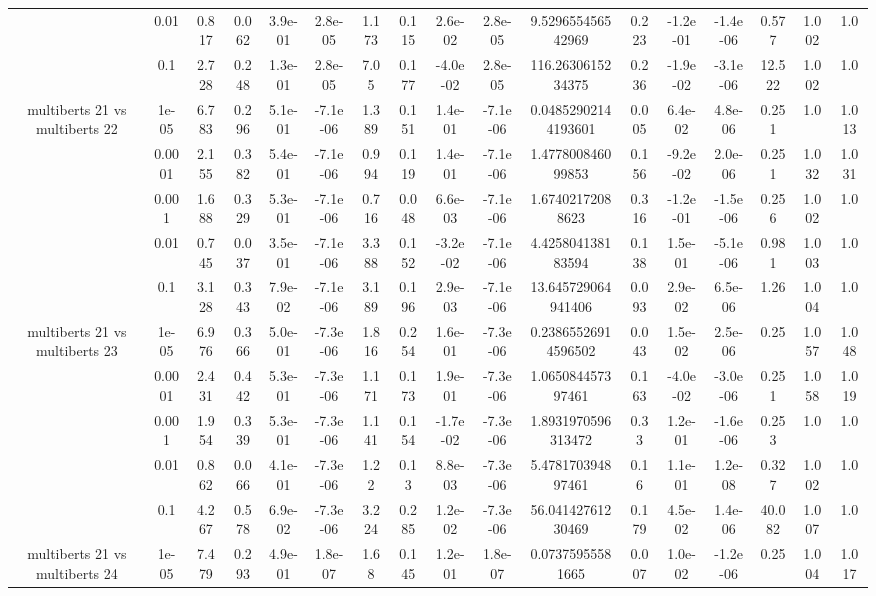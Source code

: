 \begin{tabular}{|c|c|c|c|c|c|c|c|c|c|c|c|c|c|c|c|c|}
 & 0.01 & 0.817 & 0.062 & 3.9e-01 & 2.8e-05 & 1.173 & 0.115 & 2.6e-02 & 2.8e-05 & 9.529655456542969 & 0.223 & -1.2e-01 & -1.4e-06 & 0.577 & 1.002 & 1.0 \\
 & 0.1 & 2.728 & 0.248 & 1.3e-01 & 2.8e-05 & 7.05 & 0.177 & -4.0e-02 & 2.8e-05 & 116.2630615234375 & 0.236 & -1.9e-02 & -3.1e-06 & 12.522 & 1.002 & 1.0 \\
\hline
\multirow{5}{*}{multiberts 21 vs multiberts 22} & 1e-05 & 6.783 & 0.296 & 5.1e-01 & -7.1e-06 & 1.389 & 0.151 & 1.4e-01 & -7.1e-06 & 0.04852902144193601 & 0.005 & 6.4e-02 & 4.8e-06 & 0.251 & 1.0 & 1.013 \\
 & 0.0001 & 2.155 & 0.382 & 5.4e-01 & -7.1e-06 & 0.994 & 0.119 & 1.4e-01 & -7.1e-06 & 1.477800846099853 & 0.156 & -9.2e-02 & 2.0e-06 & 0.251 & 1.032 & 1.031 \\
 & 0.001 & 1.688 & 0.329 & 5.3e-01 & -7.1e-06 & 0.716 & 0.048 & 6.6e-03 & -7.1e-06 & 1.67402172088623 & 0.316 & -1.2e-01 & -1.5e-06 & 0.256 & 1.002 & 1.0 \\
 & 0.01 & 0.745 & 0.037 & 3.5e-01 & -7.1e-06 & 3.388 & 0.152 & -3.2e-02 & -7.1e-06 & 4.425804138183594 & 0.138 & 1.5e-01 & -5.1e-06 & 0.981 & 1.003 & 1.0 \\
 & 0.1 & 3.128 & 0.343 & 7.9e-02 & -7.1e-06 & 3.189 & 0.196 & 2.9e-03 & -7.1e-06 & 13.645729064941406 & 0.093 & 2.9e-02 & 6.5e-06 & 1.26 & 1.004 & 1.0 \\
\hline
\multirow{5}{*}{multiberts 21 vs multiberts 23} & 1e-05 & 6.976 & 0.366 & 5.0e-01 & -7.3e-06 & 1.816 & 0.254 & 1.6e-01 & -7.3e-06 & 0.23865526914596502 & 0.043 & 1.5e-02 & 2.5e-06 & 0.25 & 1.057 & 1.048 \\
 & 0.0001 & 2.431 & 0.442 & 5.3e-01 & -7.3e-06 & 1.171 & 0.173 & 1.9e-01 & -7.3e-06 & 1.065084457397461 & 0.163 & -4.0e-02 & -3.0e-06 & 0.251 & 1.058 & 1.019 \\
 & 0.001 & 1.954 & 0.339 & 5.3e-01 & -7.3e-06 & 1.141 & 0.154 & -1.7e-02 & -7.3e-06 & 1.8931970596313472 & 0.33 & 1.2e-01 & -1.6e-06 & 0.253 & 1.0 & 1.0 \\
 & 0.01 & 0.862 & 0.066 & 4.1e-01 & -7.3e-06 & 1.22 & 0.13 & 8.8e-03 & -7.3e-06 & 5.478170394897461 & 0.16 & 1.1e-01 & 1.2e-08 & 0.327 & 1.002 & 1.0 \\
 & 0.1 & 4.267 & 0.578 & 6.9e-02 & -7.3e-06 & 3.224 & 0.285 & 1.2e-02 & -7.3e-06 & 56.04142761230469 & 0.179 & 4.5e-02 & 1.4e-06 & 40.082 & 1.007 & 1.0 \\
\hline
\multirow{5}{*}{multiberts 21 vs multiberts 24} & 1e-05 & 7.479 & 0.293 & 4.9e-01 & 1.8e-07 & 1.68 & 0.145 & 1.2e-01 & 1.8e-07 & 0.07375955581665 & 0.007 & 1.0e-02 & -1.2e-06 & 0.25 & 1.004 & 1.017 \\

\end{tabular}
